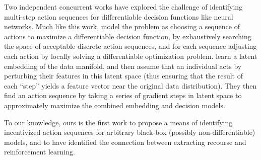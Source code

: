 Two independent concurrent works have explored the challenge of identifying multi-step action sequences for differentiable decision functions like neural networks. Much like this work, \citet{Ramakrishnan2019synthesizing} model the problem as choosing a sequence of actions to maximize a differentiable decision function, by exhaustively searching the space of acceptable discrete action sequences, and for each sequence adjusting each action by locally solving a differentiable optimization problem. \citet{Joshi2019towards} learn a latent embedding of the data manifold, and then assume that an individual acts by perturbing their features in this latent space (thus ensuring that the result of each ``step'' yields a feature vector near the original data distribution). They then find an action sequence by taking a series of gradient steps in latent space to approximately maximize the combined embedding and decision models.

To our knowledge, ours is the first work to propose a means of identifying incentivized action sequences for arbitrary black-box (possibly non-differentiable) models, and to have identified the connection between extracting recourse and reinforcement learning.
